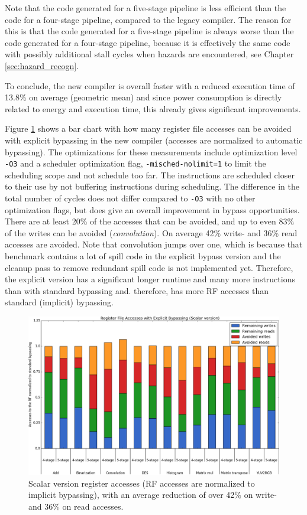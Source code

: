 Note that the code generated for a five-stage pipeline is less efficient than the code for a four-stage pipeline, compared to the legacy compiler. The reason for this is that the code generated for a five-stage pipeline is always worse than the code generated for a four-stage pipeline, because it is effectively the same code with possibly additional stall cycles when hazards are encountered, see Chapter \ref{sec:hazard_recogn}.

To conclude, the new compiler is overall faster with a reduced execution time of 13.8\% on average (geometric mean) and since power consumption is directly related to energy and execution time, this already gives significant improvements. 


Figure \ref{fig:scalar_improvements} shows a bar chart with how many register file accesses can be avoided with explicit bypassing in the new compiler (accesses are normalized to automatic bypassing). The optimizations for these measurements include optimization level \texttt{-O3} and a scheduler optimization flag, \texttt{-misched-nolimit=1} to limit the scheduling scope and not schedule too far. The instructions are scheduled closer to their use by not buffering instructions during scheduling. The difference in the total number of cycles does not differ compared to \texttt{-O3} with no other optimization flags, but does give an overall improvement in bypass opportunities. There are at least 20\% of the accesses that can be avoided, and up to even 83\% of the writes can be avoided (\emph{convolution}). On average 42\% write- and 36\% read accesses are avoided. Note that convolution jumps over one, which is because that benchmark contains a lot of spill code in the explicit bypass version and the cleanup pass to remove redundant spill code is not implemented yet. Therefore, the explicit version has a significant longer runtime and many more instructions than with standard bypassing and. therefore, has more RF accesses than standard (implicit) bypassing. 


\begin{figure}[t!]
\centering
\hspace*{-.12in}
\includegraphics[width=.875\textwidth]{figures/stats/scalar_accesses}
\caption{Scalar version register accesses (RF accesses are normalized to implicit bypassing), with an average reduction of over 42\% on write- and 36\% on read accesses.}
\label{fig:scalar_improvements}
\end{figure}

